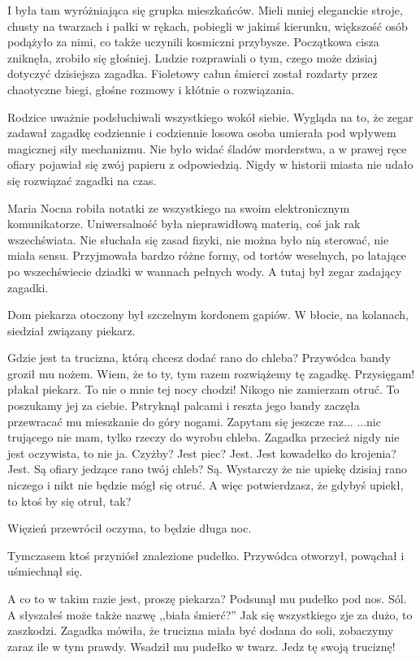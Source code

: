 I była tam wyróżniająca się grupka mieszkańców.
Mieli mniej eleganckie stroje, chusty na twarzach i pałki w rękach, pobiegli w jakimś kierunku, większość osób podążyło za nimi, co także uczynili kosmiczni przybysze.
Początkowa cisza zniknęła, zrobiło się głośniej.
Ludzie rozprawiali o tym, czego może dzisiaj dotyczyć dzisiejsza zagadka.
Fioletowy całun śmierci został rozdarty przez chaotyczne biegi, głośne rozmowy i kłótnie o rozwiązania.

Rodzice uważnie podsłuchiwali wszystkiego wokół siebie.
Wygląda na to, że zegar zadawał zagadkę codziennie i codziennie losowa osoba umierała pod wpływem magicznej siły mechanizmu.
Nie było widać śladów morderstwa, a w prawej ręce ofiary pojawiał się zwój papieru z odpowiedzią.
Nigdy w historii miasta nie udało się rozwiązać zagadki na czas.

Maria Nocna robiła notatki ze wszystkiego na swoim elektronicznym komunikatorze.
Uniwersalność była nieprawidłową materią, coś jak rak wszechświata.
Nie słuchała się zasad fizyki, nie można było nią sterować, nie miała sensu.
Przyjmowała bardzo różne formy, od tortów weselnych, po latające po wszechświecie dziadki w wannach pełnych wody.
A tutaj był zegar zadający zagadki.

Dom piekarza otoczony był szczelnym kordonem gapiów.
W błocie, na kolanach, siedział związany piekarz.
\begin{dialogue}
	\ds{} Gdzie jest ta trucizna, którą chcesz dodać rano do chleba? \dm{} Przywódca bandy groził mu nożem. \dm{} Wiem, że to ty, tym razem rozwiążemy tę zagadkę.
	\ds{} Przysięgam! \dm{} płakał piekarz. \dm{} To nie o mnie tej nocy chodzi! Nikogo nie zamierzam otruć.
	\ds{} To poszukamy jej za ciebie. \dm{} Pstryknął palcami i reszta jego bandy zaczęła przewracać mu mieszkanie do góry nogami. \ds{} Zapytam się jeszcze raz...
	\ds{} ...nic trującego nie mam, tylko rzeczy do wyrobu chleba. Zagadka przecież nigdy nie jest oczywista, to nie ja.
	\ds{} Czyżby? Jest piec? Jest. Jest kowadełko do krojenia? Jest. Są ofiary jedzące rano twój chleb? Są.
	\ds{} Wystarczy że nie upiekę dzisiaj rano niczego i nikt nie będzie mógł się otruć.
	\ds{} A więc potwierdzasz, że gdybyś upiekł, to ktoś by się otruł, tak?
\end{dialogue}
Więzień przewrócił oczyma, to będzie długa noc.

Tymczasem ktoś przyniósł znalezione pudełko.
Przywódca otworzył, powąchał i uśmiechnął się.

\begin{dialogue}
	\ds{} A co to w takim razie jest, proszę piekarza? \dm{} Podsunął mu pudełko pod nos.
	\ds{} Sól.
	\ds{} A słyszałeś może także nazwę ,,biała śmierć?''
	\ds{} Jak się wszystkiego zje za dużo, to zaszkodzi.
	\ds{} Zagadka mówiła, że trucizna miała być dodana do soli, zobaczymy zaraz ile w tym prawdy. \dm{} Wsadził mu pudełko w twarz. \dm{} Jedz tę swoją truciznę!
\end{dialogue}

